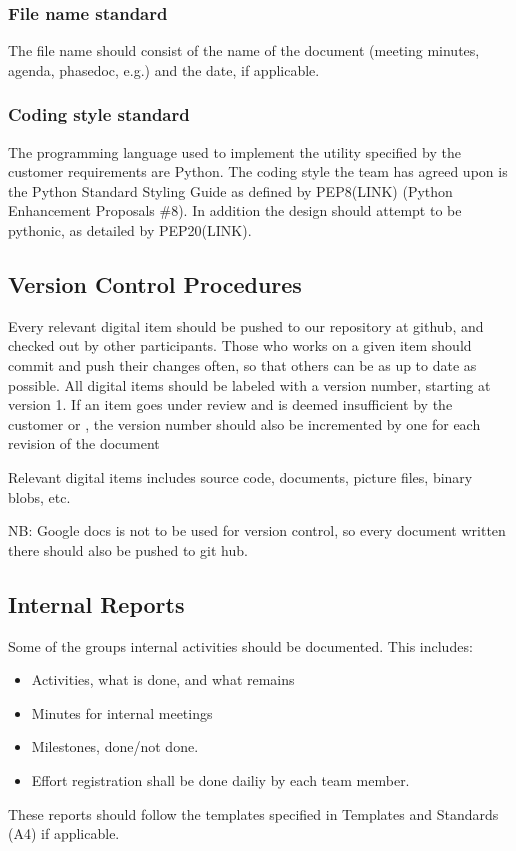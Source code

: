 \subsubsection{File name standard}
The file name should consist of the name of the document (meeting minutes,
agenda, phasedoc, e.g.) and the date, if applicable.

\subsubsection{Coding style standard}
The programming language used to implement the utility specified by the
customer requirements are Python. The coding style the team has agreed upon is
the Python Standard Styling Guide as defined by PEP8(LINK) (Python Enhancement
Proposals \#8). In addition the design should attempt to be pythonic, as
detailed by PEP20(LINK).

\subsection{Version Control Procedures}
Every relevant digital item should be pushed to our repository at github, and checked out by other participants. Those who works on a given item should commit and push their changes often, so that others can be as up to date as possible. All digital items should be labeled with a version number, starting at version 1. If an item goes under review and is deemed insufficient by the customer or  , the version number should also be incremented by one for each revision of the document

Relevant digital items includes source code, documents, picture files, binary blobs, etc.

NB: Google docs is not to be used for version control, so every document written there should also be pushed to git hub.

\subsection{Internal Reports}
Some of the groups internal activities should be documented. This includes:
\begin{itemize}
	\item Activities, what is done, and what remains
	\item Minutes for internal meetings
	\item Milestones, done/not done.
	\item Effort registration shall be done dailiy by each team member.
\end{itemize}
These reports should follow the templates specified in Templates and Standards (A4) if applicable.

